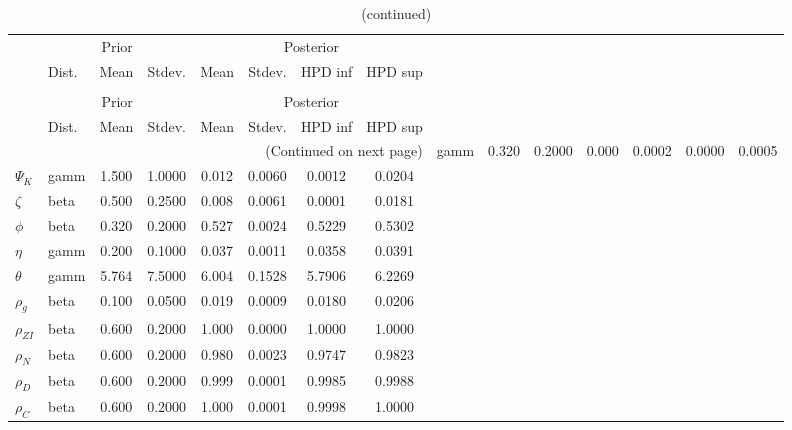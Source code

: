  
\begin{center}
\begin{longtable}{llcccccc} 
\caption{Results from Metropolis-Hastings (parameters)}
 \label{Table:MHPosterior:1}\\
\toprule 
  & \multicolumn{3}{c}{Prior}  &  \multicolumn{4}{c}{Posterior} \\
  \cmidrule(r{.75em}){2-4} \cmidrule(r{.75em}){5-8}
  & Dist. & Mean  & Stdev. & Mean & Stdev. & HPD inf & HPD sup\\
\midrule \endfirsthead 
\caption{(continued)}\\\toprule 
  & \multicolumn{3}{c}{Prior}  &  \multicolumn{4}{c}{Posterior} \\
  \cmidrule(r{.75em}){2-4} \cmidrule(r{.75em}){5-8}
  & Dist. & Mean  & Stdev. & Mean & Stdev. & HPD inf & HPD sup\\
\midrule \endhead 
\bottomrule \multicolumn{8}{r}{(Continued on next page)} \endfoot 
\bottomrule \endlastfoot 
${\sigma_a}$ & gamm &   0.320 & 0.2000 &   0.000& 0.0002 &  0.0000 &  0.0005 \\ 
${\Psi_K}$ & gamm &   1.500 & 1.0000 &   0.012& 0.0060 &  0.0012 &  0.0204 \\ 
${\zeta}$ & beta &   0.500 & 0.2500 &   0.008& 0.0061 &  0.0001 &  0.0181 \\ 
${\phi}$ & beta &   0.320 & 0.2000 &   0.527& 0.0024 &  0.5229 &  0.5302 \\ 
${\eta}$ & gamm &   0.200 & 0.1000 &   0.037& 0.0011 &  0.0358 &  0.0391 \\ 
${\theta}$ & gamm &   5.764 & 7.5000 &   6.004& 0.1528 &  5.7906 &  6.2269 \\ 
${\rho_g}$ & beta &   0.100 & 0.0500 &   0.019& 0.0009 &  0.0180 &  0.0206 \\ 
${\rho_{ZI}}$ & beta &   0.600 & 0.2000 &   1.000& 0.0000 &  1.0000 &  1.0000 \\ 
${\rho_N}$ & beta &   0.600 & 0.2000 &   0.980& 0.0023 &  0.9747 &  0.9823 \\ 
${\rho_D}$ & beta &   0.600 & 0.2000 &   0.999& 0.0001 &  0.9985 &  0.9988 \\ 
${\rho_C}$ & beta &   0.600 & 0.2000 &   1.000& 0.0001 &  0.9998 &  1.0000 \\ 
\end{longtable}
 \end{center}
